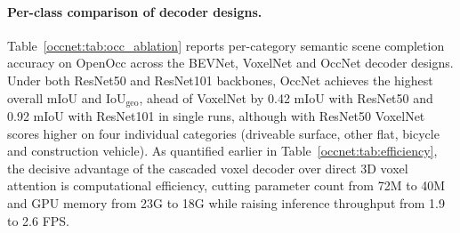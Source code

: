 \paragraph{Per-class comparison of decoder designs.} Table~\ref{occnet:tab:occ_ablation} reports per-category semantic scene completion accuracy on OpenOcc across the BEVNet, VoxelNet and OccNet decoder designs. Under both ResNet50 and ResNet101 backbones, OccNet achieves the highest overall mIoU and $\text{IoU}_{\text{geo}}$, ahead of VoxelNet by 0.42 mIoU with ResNet50 and 0.92 mIoU with ResNet101 in single runs, although with ResNet50 VoxelNet scores higher on four individual categories (driveable surface, other flat, bicycle and construction vehicle). As quantified earlier in Table~\ref{occnet:tab:efficiency}, the decisive advantage of the cascaded voxel decoder over direct 3D voxel attention is computational efficiency, cutting parameter count from 72M to 40M and GPU memory from 23G to 18G while raising inference throughput from 1.9 to 2.6 FPS.

